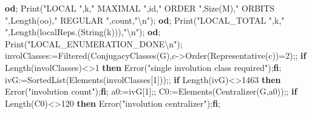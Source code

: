 \documentclass[
  10pt,
  letterpaper,
]{article}
\newenvironment{Shaded}{}{}
\newcommand{\BuiltInTok}[1]{\textcolor[rgb]{0.00,0.50,0.00}{#1}}
\newcommand{\ControlFlowTok}[1]{\textcolor[rgb]{0.00,0.44,0.13}{\textbf{#1}}}
\newcommand{\FloatTok}[1]{\textcolor[rgb]{0.25,0.63,0.44}{#1}}
\newcommand{\NormalTok}[1]{#1}
\newcommand{\OperatorTok}[1]{\textcolor[rgb]{0.40,0.40,0.40}{#1}}
\newcommand{\StringTok}[1]{\textcolor[rgb]{0.25,0.44,0.63}{#1}}
\newcommand{\VariableTok}[1]{\textcolor[rgb]{0.10,0.09,0.49}{#1}}
\begin{document}
\begin{Shaded}
\begin{Highlighting}[]
  \ControlFlowTok{od}\OperatorTok{;}
  \BuiltInTok{Print}\NormalTok{(}\StringTok{"LOCAL "}\OperatorTok{,}\VariableTok{k}\OperatorTok{,}\StringTok{" MAXIMAL "}\OperatorTok{,}\VariableTok{id}\OperatorTok{,}\StringTok{" ORDER "}\OperatorTok{,}\BuiltInTok{Size}\NormalTok{(}\VariableTok{M}\NormalTok{)}\OperatorTok{,}\StringTok{" ORBITS "}\OperatorTok{,}\BuiltInTok{Length}\NormalTok{(}\VariableTok{oo}\NormalTok{)}\OperatorTok{,}\StringTok{" REGULAR "}\OperatorTok{,}\VariableTok{count}\OperatorTok{,}\StringTok{"\textbackslash{}n"}\NormalTok{)}\OperatorTok{;}
 \ControlFlowTok{od}\OperatorTok{;}
 \BuiltInTok{Print}\NormalTok{(}\StringTok{"LOCAL\_TOTAL "}\OperatorTok{,}\VariableTok{k}\OperatorTok{,}\StringTok{" "}\OperatorTok{,}\BuiltInTok{Length}\NormalTok{(}\VariableTok{localReps}\NormalTok{.(}\BuiltInTok{String}\NormalTok{(}\VariableTok{k}\NormalTok{)))}\OperatorTok{,}\StringTok{"\textbackslash{}n"}\NormalTok{)}\OperatorTok{;}
\ControlFlowTok{od}\OperatorTok{;}
\BuiltInTok{Print}\NormalTok{(}\StringTok{"LOCAL\_ENUMERATION\_DONE\textbackslash{}n"}\NormalTok{)}\OperatorTok{;}
\VariableTok{involClasses}\OperatorTok{:=}\BuiltInTok{Filtered}\NormalTok{(}\BuiltInTok{ConjugacyClasses}\NormalTok{(}\VariableTok{G}\NormalTok{)}\OperatorTok{,}\VariableTok{c}\OperatorTok{{-}\textgreater{}}\BuiltInTok{Order}\NormalTok{(}\BuiltInTok{Representative}\NormalTok{(}\VariableTok{c}\NormalTok{))}\OperatorTok{=}\FloatTok{2}\NormalTok{)}\OperatorTok{;;}
\ControlFlowTok{if} \BuiltInTok{Length}\NormalTok{(}\VariableTok{involClasses}\NormalTok{)}\OperatorTok{\textless{}\textgreater{}}\FloatTok{1} \ControlFlowTok{then} \BuiltInTok{Error}\NormalTok{(}\StringTok{"single involution class required"}\NormalTok{)}\OperatorTok{;}\ControlFlowTok{fi}\OperatorTok{;}
\VariableTok{ivG}\OperatorTok{:=}\BuiltInTok{SortedList}\NormalTok{(}\BuiltInTok{Elements}\NormalTok{(}\VariableTok{involClasses}\NormalTok{[}\FloatTok{1}\NormalTok{]))}\OperatorTok{;;}
\ControlFlowTok{if} \BuiltInTok{Length}\NormalTok{(}\VariableTok{ivG}\NormalTok{)}\OperatorTok{\textless{}\textgreater{}}\FloatTok{1463} \ControlFlowTok{then} \BuiltInTok{Error}\NormalTok{(}\StringTok{"involution count"}\NormalTok{)}\OperatorTok{;}\ControlFlowTok{fi}\OperatorTok{;}
\VariableTok{a0}\OperatorTok{:=}\VariableTok{ivG}\NormalTok{[}\FloatTok{1}\NormalTok{]}\OperatorTok{;;} \VariableTok{C0}\OperatorTok{:=}\BuiltInTok{Elements}\NormalTok{(}\BuiltInTok{Centralizer}\NormalTok{(}\VariableTok{G}\OperatorTok{,}\VariableTok{a0}\NormalTok{))}\OperatorTok{;;}
\ControlFlowTok{if} \BuiltInTok{Length}\NormalTok{(}\VariableTok{C0}\NormalTok{)}\OperatorTok{\textless{}\textgreater{}}\FloatTok{120} \ControlFlowTok{then} \BuiltInTok{Error}\NormalTok{(}\StringTok{"involution centralizer"}\NormalTok{)}\OperatorTok{;}\ControlFlowTok{fi}\OperatorTok{;}

\end{Highlighting}
\end{Shaded}
\end{document}
